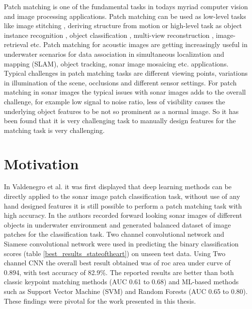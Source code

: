 Patch matching is one of the fundamental tasks in todays myriad computer vision and image processing applications. Patch matching can be used as low-level tasks like image stitching \cite{brown2007automatic}, 
deriving structure from motion \cite{molton2004locally} or high-level task as object instance recognition \cite{lowe1999object}, object classification \cite{yao2012codebook}, multi-view reconstruction \cite{seitz2006comparison}, 
image-retrieval etc. 
Patch matching for acoustic images are getting increasingly useful in underwater scenarios for data association in simultaneous localization and mapping (SLAM), object tracking, sonar image mosaicing \cite{hurtos2012fourier}
etc. applications. Typical challenges in patch matching tasks are different viewing points, variations in illumination of the scene, occlusions and different sensor settings. For patch matching in sonar images the typical issues 
with sonar images adds to the overall challenge, for example low signal to noise ratio, less of visibility causes the underlying object features to be not so prominent as a normal image. So it has been found that it is very 
challenging task to manually design features for the matching task is very challenging. %

\section{Motivation}

In Valdenegro et al. \cite{stateoftheart} it was first displayed that deep learning methods can be directly applied to the sonar image patch classification task, without use of any hand designed features it is still possible 
to perform a patch matching task with high accuracy. In \cite{stateoftheart} the authors recorded forward looking sonar images of different objects in underwater environment and generated balanced dataset
of image patches for the classification task.
Two channel convolutional network and Siamese convolutional network were used in predicting the binary classification scores (table \ref{best_results_stateoftheart}) on unseen test data. Using Two channel CNN the overall 
best result obtained was of roc area under curve of 0.894, with test accuracy of 82.9\%. The reported results are
better than both classic keypoint matching methods (AUC 0.61 to 0.68) and ML-based methods such as Support Vector Machine (SVM) and Random Forests (AUC 0.65 to 0.80). These findings were pivotal for the work presented in this thesis.

